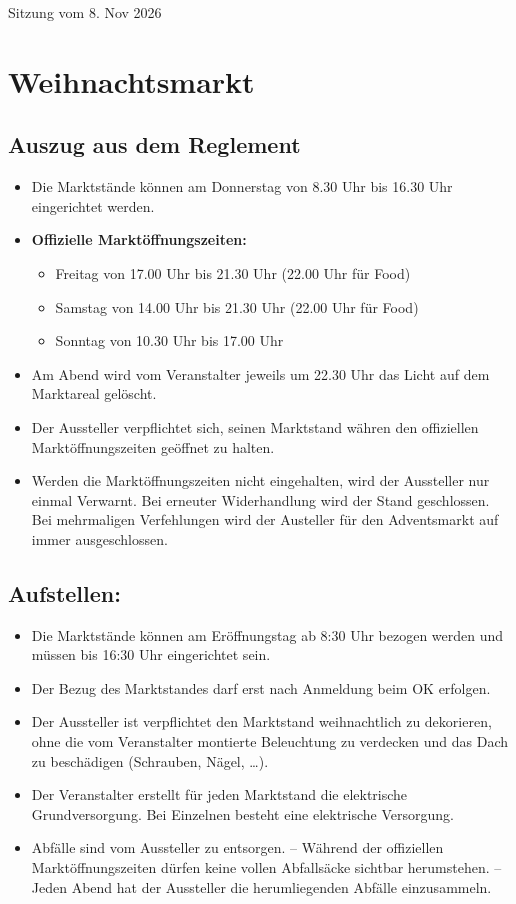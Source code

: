 \documentclass{mybib}
\begin{document}
    
    {\hfill Sitzung vom 8. Nov 2026}

\section{Weihnachtsmarkt}

\subsection{Auszug aus dem Reglement}
\begin{itemize}
  \item Die Marktstände können am Donnerstag von 8.30 Uhr bis 16.30 Uhr eingerichtet werden. 
  \item \textbf{Offizielle Marktöffnungszeiten:}
  \begin{itemize}  
    \item Freitag von 17.00 Uhr bis 21.30 Uhr (22.00 Uhr für Food) 
    \item Samstag von 14.00 Uhr bis 21.30 Uhr (22.00 Uhr für Food) 
    \item Sonntag von 10.30 Uhr bis 17.00 Uhr
  \end{itemize}
  \item Am Abend wird vom Veranstalter jeweils um 22.30 Uhr das Licht auf dem Marktareal gelöscht. 
  \item Der Aussteller verpflichtet sich, seinen Marktstand währen den offiziellen Marktöffnungszeiten geöffnet zu halten. 
  \item Werden die Marktöffnungszeiten nicht eingehalten, wird der Aussteller nur einmal Verwarnt. Bei erneuter Widerhandlung wird der Stand geschlossen. Bei mehrmaligen Verfehlungen wird der Austeller für den Adventsmarkt auf immer ausgeschlossen.
\end{itemize}

\subsection{Aufstellen:}
\begin{itemize}

  \item Die Marktstände können am Eröffnungstag ab 8:30 Uhr bezogen werden und müssen bis 16:30 Uhr eingerichtet sein.
  \item Der Bezug des Marktstandes darf erst nach Anmeldung beim OK erfolgen.
  \item Der Aussteller ist verpflichtet den Marktstand weihnachtlich zu dekorieren, ohne die vom Veranstalter montierte Beleuchtung zu verdecken und das Dach zu beschädigen (Schrauben, Nägel, …).
  \item Der Veranstalter erstellt für jeden Marktstand die elektrische Grundversorgung. Bei Einzelnen besteht eine elektrische Versorgung.
  \item Abfälle sind vom Aussteller zu entsorgen. -- Während der offiziellen Marktöffnungszeiten dürfen keine vollen Abfallsäcke sichtbar herumstehen. -- Jeden Abend hat der Aussteller die herumliegenden Abfälle einzusammeln.
\end{itemize}
\end{document}
